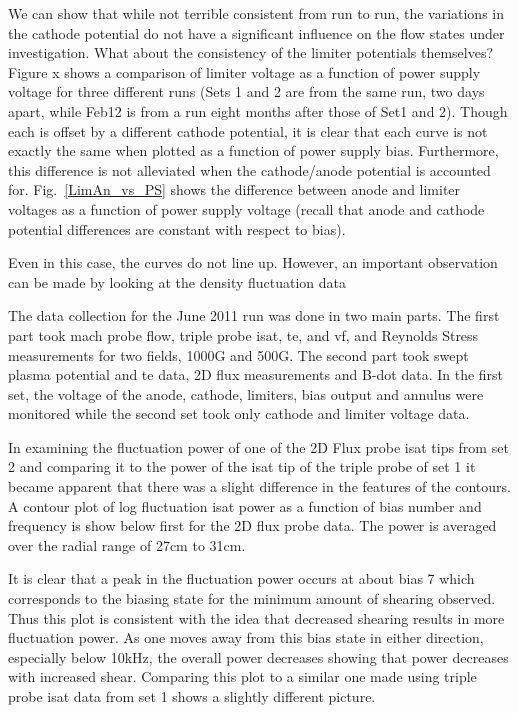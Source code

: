 \documentclass[aip,pop,amsmath,amssymb,preprint,superscriptaddress]{revtex4-1} %
\begin{document}
We can show that while not terrible consistent from run to run, the variations in the cathode potential do not have a significant influence on the flow states under investigation. What about the consistency of the limiter potentials themselves? Figure x shows a comparison of limiter voltage as a function of power supply voltage for three different runs (Sets 1 and 2 are from the same run, two days apart, while Feb12 is from a run eight months after those of Set1 and 2). Though each is offset by a different cathode potential, it is clear that each curve is not exactly the same when plotted as a function of power supply bias. Furthermore, this difference is not alleviated when the cathode/anode potential is accounted for. Fig.~\ref{LimAn_vs_PS} shows the difference between anode and limiter voltages as a function of power supply voltage (recall that anode and cathode potential differences are constant with respect to bias). 

Even in this case, the curves do not line up. However, an important observation can be made by looking at the density fluctuation data

The data collection for the June 2011 run was done in two main parts. The first part took mach probe flow, triple probe isat, te, and vf, and Reynolds Stress measurements for two fields, 1000G and 500G. The second part took swept plasma potential and te data, 2D flux measurements and B-dot data. In the first set, the voltage of the anode, cathode, limiters, bias output and annulus were monitored while the second set took only cathode and limiter voltage data.

In examining the fluctuation power of one of the 2D Flux probe isat tips from set 2 and comparing it to the power of the isat tip of the triple probe of set 1 it became apparent that there was a slight difference in the features of the contours. A contour plot of log fluctuation isat power as a function of bias number and frequency is show below first for the 2D flux probe data. The power is averaged over the radial range of 27cm to 31cm.

It is clear that a peak in the fluctuation power occurs at about bias 7 which corresponds to the biasing state for the minimum amount of shearing observed. Thus this plot is consistent with the idea that decreased shearing results in more fluctuation power. As one moves away from this bias state in either direction, especially below 10kHz, the overall power decreases showing that power decreases with increased shear.  Comparing this plot to a similar one made using triple probe isat data from set 1 shows a slightly different picture.
\end{document}

